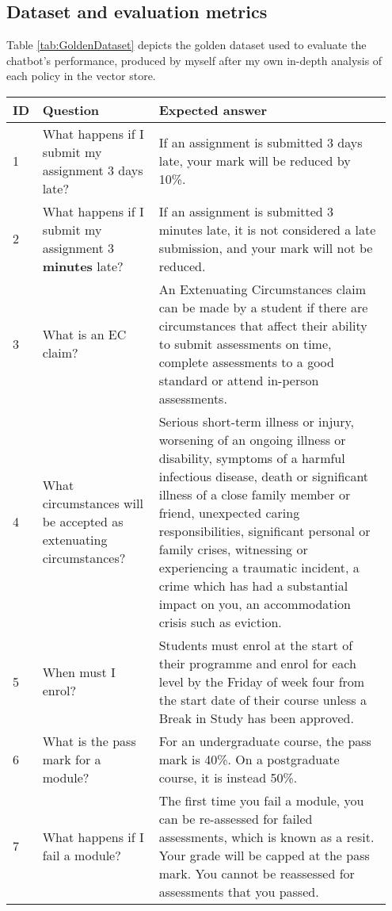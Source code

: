 \subsection{Dataset and evaluation metrics}

\para Table \ref{tab:GoldenDataset} depicts the golden dataset used to evaluate the chatbot's performance, produced by myself after my own in-depth analysis of each policy in the vector store. 

\begin{longtable}{ | p{0.05\linewidth} | p{0.3\linewidth} | p{0.6\linewidth} | }
    \hline
    \cellcolor{blue!25} ID & \cellcolor{blue!25} Question & \cellcolor{blue!25} Expected answer \\
    \hline
    1 & What happens if I submit my assignment 3 days late? &
    If an assignment is submitted 3 days late, your mark will be reduced by 10\%. \\
    \hline
    2 & What happens if I submit my assignment 3 \textbf{minutes} late? &
    If an assignment is submitted 3 minutes late, it is not considered a late submission, and your mark will not be reduced. \\
    \hline 
    3 & What is an EC claim? &
    An Extenuating Circumstances claim can be made by a student if there are circumstances that affect their ability to submit assessments on time, complete assessments to a good standard or attend in-person assessments. \\
    \hline 
    4 & What circumstances will be accepted as extenuating circumstances? &
    Serious short-term illness or injury, worsening of an ongoing illness or disability, symptoms of a harmful infectious disease, death or significant illness of a close family member or friend, unexpected caring responsibilities, significant personal or family crises, witnessing or experiencing a traumatic incident, a crime which has had a substantial impact on you, an accommodation crisis such as eviction.\\
    \hline 
    5 & When must I enrol? & 
    Students must enrol at the start of their programme and enrol for each level by the Friday of week four from the start date of their course unless a Break in Study has been approved. \\
    \hline 
    6 & What is the pass mark for a module? &
    For an undergraduate course, the pass mark is 40\%. On a postgraduate course, it is instead 50\%. \\
    \hline 
    7 & What happens if I fail a module? &
    The first time you fail a module, you can be re-assessed for failed assessments, which is known as a resit. Your grade will be capped at the pass mark. You cannot be reassessed for assessments that you passed. \\ 

\end{longtable}

